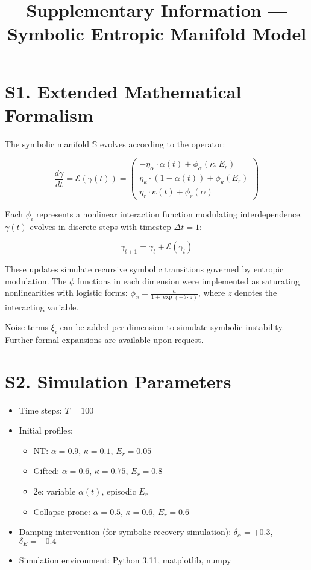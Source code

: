 \documentclass[12pt]{article}
\title{Supplementary Information — Symbolic Entropic Manifold Model}
\date{}
\begin{document}
\maketitle

\section*{S1. Extended Mathematical Formalism}

The symbolic manifold $\mathbb{S}$ evolves according to the operator:

\[
\frac{d\gamma}{dt} = \mathcal{E}(\gamma(t)) = 
\begin{pmatrix}
    -\eta_\alpha \cdot \alpha(t) + \phi_\alpha(\kappa,E_r) \\
    \eta_\kappa \cdot (1 - \alpha(t)) + \phi_\kappa(E_r) \\
    \eta_r \cdot \kappa(t) + \phi_r(\alpha)
\end{pmatrix}
\]

Each $\phi_i$ represents a nonlinear interaction function modulating interdependence. $\gamma(t)$ evolves in discrete steps with timestep $\Delta t = 1$:

\[
\gamma_{t+1} = \gamma_t + \mathcal{E}(\gamma_t)
\]

These updates simulate recursive symbolic transitions governed by entropic modulation. The $\phi$ functions in each dimension were implemented as saturating nonlinearities with logistic forms: $\phi_x = \frac{a}{1 + \exp(-b \cdot z)}$, where $z$ denotes the interacting variable.

Noise terms $\xi_i$ can be added per dimension to simulate symbolic instability. Further formal expansions are available upon request.

\section*{S2. Simulation Parameters}

\begin{itemize}
    \item Time steps: $T = 100$
    \item Initial profiles:
    \begin{itemize}
        \item NT: $\alpha=0.9$, $\kappa=0.1$, $E_r=0.05$
        \item Gifted: $\alpha=0.6$, $\kappa=0.75$, $E_r=0.8$
        \item 2e: variable $\alpha(t)$, episodic $E_r$
        \item Collapse-prone: $\alpha=0.5$, $\kappa=0.6$, $E_r=0.6$
    \end{itemize}
    \item Damping intervention (for symbolic recovery simulation): $\delta_\alpha = +0.3$, $\delta_E = -0.4$
    \item Simulation environment: Python 3.11, matplotlib, numpy
\end{itemize}
\end{document}
